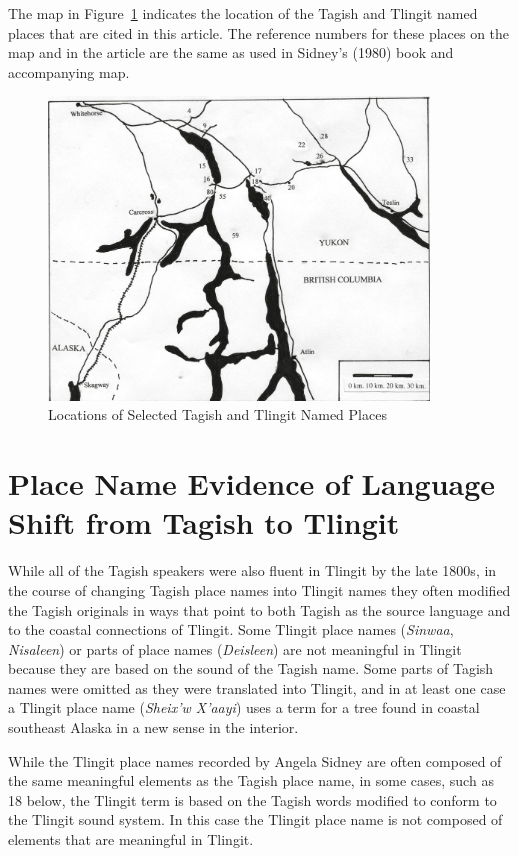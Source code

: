 The map in Figure~\ref{moore-map} indicates the location of the Tagish and Tlingit named places that are cited in this article. The reference numbers for these places on the map and in the article are the same as used in Sidney’s (1980) book and accompanying map.

\begin{figure}[h]
\centering
\includegraphics[width=0.9\textwidth]{figures/moore-fig1}
\caption{Locations of Selected Tagish and Tlingit Named Places}\label{moore-map}
\end{figure}

\section{Place Name Evidence of Language Shift from Tagish to Tlingit}
While all of the Tagish speakers were also fluent in Tlingit by the late 1800s, in the course of changing Tagish place names into Tlingit names they often modified the Tagish originals in ways that point to both Tagish as the source language and to the coastal connections of Tlingit. Some Tlingit place names (\textit{Sinwaa}, \textit{Nisaleen}) or parts of place names (\textit{Deisleen}) are not meaningful in Tlingit because they are based on the sound of the Tagish name. Some parts of Tagish names were omitted as they were translated into Tlingit, and in at least one case a Tlingit place name (\textit{Sheix’w X’aayi}) uses a term for a tree found in coastal southeast Alaska in a new sense in the interior.

While the Tlingit place names recorded by Angela Sidney are often composed of the same meaningful elements as the Tagish place name, in some cases, such as 18 below, the Tlingit term is based on the Tagish words modified to conform to the Tlingit sound system. In this case the Tlingit place name is not composed of elements that are meaningful in Tlingit.

